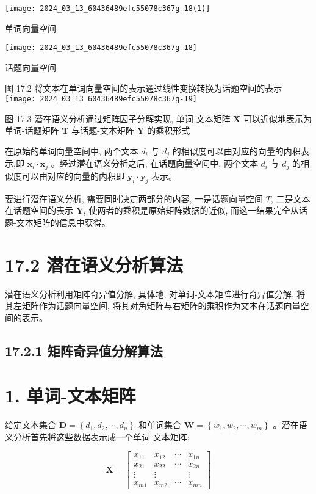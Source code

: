 \documentclass[10pt]{article}
\begin{document}
\begin{center}
\texttt{[image: 2024\_03\_13\_60436489efc55078c367g-18(1)]}
\end{center}

单词向量空间

\begin{center}
\texttt{[image: 2024\_03\_13\_60436489efc55078c367g-18]}
\end{center}

话题向量空间

图 17.2 将文本在单词向量空间的表示通过线性变换转换为话题空间的表示\\
\texttt{[image: 2024\_03\_13\_60436489efc55078c367g-19]}

图 17.3 潜在语义分析通过矩阵因子分解实现, 单词-文本矩阵 $\boldsymbol{X}$ 可以近似地表示为单词-话题矩阵 $\boldsymbol{T}$ 与话题-文本矩阵 $\boldsymbol{Y}$ 的乘积形式

在原始的单词向量空间中, 两个文本 $d_{i}$ 与 $d_{j}$ 的相似度可以由对应的向量的内积表示,即 $\boldsymbol{x}_{i} \cdot \boldsymbol{x}_{j}$ 。经过潜在语义分析之后, 在话题向量空间中, 两个文本 $d_{i}$ 与 $d_{j}$ 的相似度可以由对应的向量的内积即 $\boldsymbol{y}_{i} \cdot \boldsymbol{y}_{j}$ 表示。

要进行潜在语义分析, 需要同时决定两部分的内容, 一是话题向量空间 $T$, 二是文本在话题空间的表示 $\boldsymbol{Y}$, 使两者的乘积是原始矩阵数据的近似, 而这一结果完全从话题-文本矩阵的信息中获得。

\section*{17.2 潜在语义分析算法}
潜在语义分析利用矩阵奇异值分解, 具体地, 对单词-文本矩阵进行奇异值分解, 将其左矩阵作为话题向量空间, 将其对角矩阵与右矩阵的乘积作为文本在话题向量空间的表示。

\subsection*{17.2.1 矩阵奇异值分解算法}
\section*{1. 单词-文本矩阵}
给定文本集合 $\boldsymbol{D}=\left\{d_{1}, d_{2}, \cdots, d_{n}\right\}$ 和单词集合 $\boldsymbol{W}=\left\{w_{1}, w_{2}, \cdots, w_{m}\right\}$ 。潜在语义分析首先将这些数据表示成一个单词-文本矩阵:

\[
\boldsymbol{X}=\left[\begin{array}{cccc}
x_{11} & x_{12} & \cdots & x_{1 n}  \tag{17.12}\\
x_{21} & x_{22} & \cdots & x_{2 n} \\
\vdots & \vdots & & \vdots \\
x_{m 1} & x_{m 2} & \cdots & x_{m n}
\end{array}\right]
\]
\end{document}
